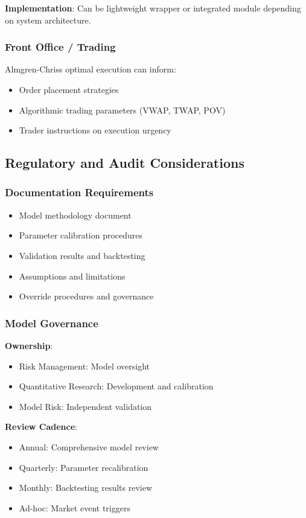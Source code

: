 \documentclass[11pt,a4paper]{article}
\begin{document}
\textbf{Implementation}: Can be lightweight wrapper or integrated module depending on system architecture.

\subsubsection{Front Office / Trading}

Almgren-Chriss optimal execution can inform:
\begin{itemize}
    \item Order placement strategies
    \item Algorithmic trading parameters (VWAP, TWAP, POV)
    \item Trader instructions on execution urgency
\end{itemize}

\subsection{Regulatory and Audit Considerations}

\subsubsection{Documentation Requirements}

\begin{itemize}
    \item Model methodology document
    \item Parameter calibration procedures
    \item Validation results and backtesting
    \item Assumptions and limitations
    \item Override procedures and governance
\end{itemize}

\subsubsection{Model Governance}

\textbf{Ownership}:
\begin{itemize}
    \item Risk Management: Model oversight
    \item Quantitative Research: Development and calibration
    \item Model Risk: Independent validation
\end{itemize}

\textbf{Review Cadence}:
\begin{itemize}
    \item Annual: Comprehensive model review
    \item Quarterly: Parameter recalibration
    \item Monthly: Backtesting results review
    \item Ad-hoc: Market event triggers
\end{itemize}
\end{document}
